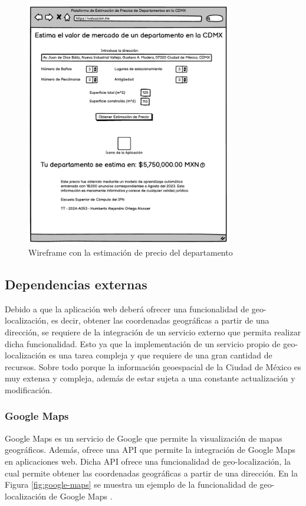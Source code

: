 \begin{figure}[H]
    \centering
    \includegraphics[width=0.8\textwidth]{imagenes/04-diseno/wireframe-2.png}
    \caption{Wireframe con la estimación de precio del departamento}
    \label{fig:wireframes-2}
\end{figure}

\subsection{Dependencias externas}

Debido a que la aplicación web deberá ofrecer una funcionalidad de geo-localización,
es decir, obtener las coordenadas geográficas a partir de una dirección, se requiere
de la integración de un servicio externo que permita realizar dicha funcionalidad.
Esto ya que la implementación de un servicio propio de geo-localización es una tarea
compleja y que requiere de una gran cantidad de recursos. Sobre todo porque
la información geoespacial de la Ciudad de México es muy extensa y compleja, además
de estar sujeta a una constante actualización y modificación.

\subsubsection{Google Maps}

Google Maps es un servicio de Google que permite la visualización de mapas
geográficos. Además, ofrece una API que permite la integración de Google Maps
en aplicaciones web. Dicha API ofrece una funcionalidad de geo-localización,
la cual permite obtener las coordenadas geográficas a partir de una dirección.
En la Figura \ref{fig:google-maps} se muestra un ejemplo de la funcionalidad
de geo-localización de Google Maps \cite{google_geocoding_2023}.

